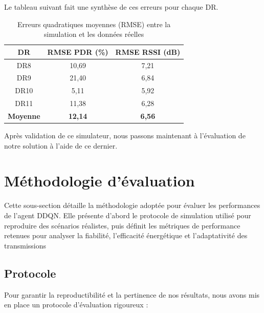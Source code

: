 Le tableau suivant fait une synthèse de ces erreurs pour chaque DR.

\begin{table}[H]
	\centering
	\caption{Erreurs quadratiques moyennes (RMSE) entre la simulation et les données réelles}
	\label{tab:validation_errors}
	\begin{tabular}{|c|c|c|}
		\hline
		\textbf{DR} & \textbf{RMSE PDR (\%)} & \textbf{RMSE RSSI (dB)} \\
		\hline
		DR8  & 10,69 & 7,21 \\
		DR9  & 21,40 & 6,84 \\
		DR10 & 5,11  & 5,92 \\
		DR11 & 11,38 & 6,28 \\
		\hline
		\textbf{Moyenne} & \textbf{12,14} & \textbf{6,56} \\
		\hline
	\end{tabular}
\end{table}

Après validation de ce simulateur, nous passons maintenant à l'évaluation de notre solution à l'aide de ce dernier.

\section{Méthodologie d'évaluation}
\label{sec:methodo-eval}
Cette sous-section détaille la méthodologie adoptée pour évaluer les performances de l’agent DDQN. Elle présente d’abord le protocole de simulation utilisé pour reproduire des scénarios réalistes, puis définit les métriques de performance retenues pour analyser la fiabilité, l’efficacité énergétique et l’adaptativité des transmissions

\subsection{Protocole}
\label{subsec:protocole-eval}

Pour garantir la reproductibilité et la pertinence de nos résultats, nous avons mis en place un protocole d'évaluation rigoureux :

